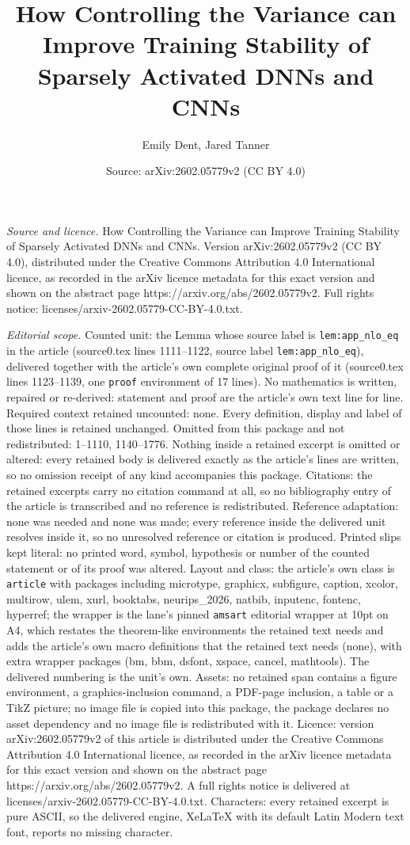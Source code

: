 \documentclass[10pt,a4paper]{amsart}
\title[How Controlling the Variance can Improve Training Stability ]{How Controlling the Variance can Improve Training Stability of Sparsely Activated DNNs and CNNs}
\author{Emily Dent, Jared Tanner}
\date{Source: arXiv:2602.05779v2 (CC BY 4.0)}
\begin{document}
\maketitle

\noindent\emph{Source and licence.} How Controlling the Variance can Improve Training Stability of Sparsely Activated DNNs and CNNs. Version arXiv:2602.05779v2 (CC BY 4.0), distributed under the Creative Commons Attribution 4.0 International licence, as recorded in the arXiv licence metadata for this exact version and shown on the abstract page https://arxiv.org/abs/2602.05779v2. Full rights notice: licenses/arxiv-2602.05779-CC-BY-4.0.txt.\par\smallskip

\noindent\textit{Editorial scope.} Counted unit: the Lemma whose source label is \texttt{lem:app\_nlo\_eq} in the article (source0.tex lines 1111--1122, source label \texttt{lem:app\_nlo\_eq}), delivered together with the article's own complete original proof of it (source0.tex lines 1123--1139, one \texttt{proof} environment of 17 lines). No mathematics is written, repaired or re-derived: statement and proof are the article's own text line for line. Required context retained uncounted: none. Every definition, display and label of those lines is retained unchanged. Omitted from this package and not redistributed: 1--1110, 1140--1776. Nothing inside a retained excerpt is omitted or altered: every retained body is delivered exactly as the article's lines are written, so no omission receipt of any kind accompanies this package. Citations: the retained excerpts carry no citation command at all, so no bibliography entry of the article is transcribed and no reference is redistributed. Reference adaptation: none was needed and none was made; every reference inside the delivered unit resolves inside it, so no unresolved reference or citation is produced. Printed slips kept literal: no printed word, symbol, hypothesis or number of the counted statement or of its proof was altered. Layout and class: the article's own class is \texttt{article} with packages including microtype, graphicx, subfigure, caption, xcolor, multirow, ulem, xurl, booktabs, neurips\_2026, natbib, inputenc, fontenc, hyperref; the wrapper is the lane's pinned \texttt{amsart} editorial wrapper at 10pt on A4, which restates the theorem-like environments the retained text needs and adds the article's own macro definitions that the retained text needs (none), with extra wrapper packages (bm, bbm, dsfont, xspace, cancel, mathtools). The delivered numbering is the unit's own. Assets: no retained span contains a figure environment, a graphics-inclusion command, a PDF-page inclusion, a table or a TikZ picture; no image file is copied into this package, the package declares no asset dependency and no image file is redistributed with it. Licence: version arXiv:2602.05779v2 of this article is distributed under the Creative Commons Attribution 4.0 International licence, as recorded in the arXiv licence metadata for this exact version and shown on the abstract page https://arxiv.org/abs/2602.05779v2. A full rights notice is delivered at licenses/arxiv-2602.05779-CC-BY-4.0.txt. Characters: every retained excerpt is pure ASCII, so the delivered engine, XeLaTeX with its default Latin Modern text font, reports no missing character.
\end{document}
